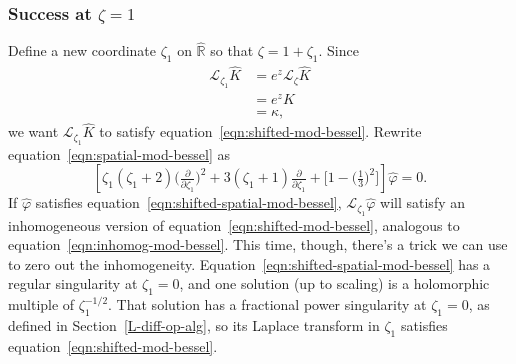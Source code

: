 \documentclass{article}
\newcommand{\R}{\mathbb{R}}
\newcommand{\laplace}{\mathcal{L}}
\begin{document}
\subsubsection{Success at $\zeta = 1$}\label{spatial-success}
Define a new coordinate $\zeta_1$ on $\hat{\R}$ so that $\zeta = 1 + \zeta_1$. Since
\begin{align*}
\laplace_{\zeta_1} \hat{K} & = e^z \laplace_\zeta \hat{K} \\
& = e^z K \\
& = \kappa,
\end{align*}
we want $\laplace_{\zeta_1} \hat{K}$ to satisfy equation~\ref{eqn:shifted-mod-bessel}. Rewrite equation~\ref{eqn:spatial-mod-bessel} as
\begin{equation}\label{eqn:shifted-spatial-mod-bessel}
\left[\zeta_1(\zeta_1 + 2) \big(\tfrac{\partial}{\partial \zeta_1}\big)^2 + 3(\zeta_1 + 1) \tfrac{\partial}{\partial \zeta_1} + \big[1 - \big(\tfrac{1}{3}\big)^2\big]\right] \hat{\varphi} = 0.
\end{equation}
If $\hat{\varphi}$ satisfies equation~\ref{eqn:shifted-spatial-mod-bessel}, $\laplace_{\zeta_1} \hat{\varphi}$ will satisfy an inhomogeneous version of equation~\ref{eqn:shifted-mod-bessel}, analogous to equation~\ref{eqn:inhomog-mod-bessel}. This time, though, there's a trick we can use to zero out the inhomogeneity. Equation~\ref{eqn:shifted-spatial-mod-bessel} has a regular singularity at $\zeta_1 = 0$, and one solution (up to scaling) is a holomorphic multiple of $\zeta_1^{-1/2}$. That solution has a fractional power singularity at $\zeta_1 = 0$, as defined in Section~\ref{L-diff-op-alg}, so its Laplace transform in $\zeta_1$ satisfies equation~\ref{eqn:shifted-mod-bessel}.
\end{document}
